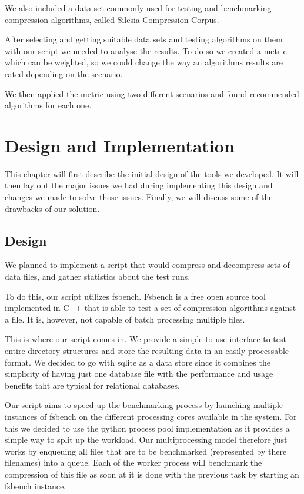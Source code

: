 \documentclass[
	12pt,
	a4paper,
	BCOR10mm,
	DIV14,
	listof=totoc,
	bibliography=totoc,
	headsepline
]{scrreprt}
\begin{document}
We also included a data set commonly used for testing and benchmarking compression algorithms, called Silesia Compression Corpus.

After selecting and getting suitable data sets and testing algorithms on them with our script we needed to analyse the results. To do so we created a metric which can be weighted, so we could change the way an algorithms results are rated depending on the scenario.

We then applied the metric using two different scenarios and found recommended algorithms for each one.

\chapter{Design and Implementation}
\label{Design}

This chapter will first describe the initial design of the tools we developed. It will then lay out the major issues we had during implementing this design and changes we made to solve those issues. Finally, we will discuss some of the drawbacks of our solution.

\section{Design}

We planned to implement a script that would compress and decompress sets of data files, and gather statistics about the test runs.

To do this, our script utilizes fsbench. Fsbench is a free open source tool implemented in C++ that is able to test a set of compression algorithms against a file. It is, however, not capable of batch processing multiple files.

This is where our script comes in. We provide a simple-to-use interface to test entire directory structures and store the resulting data in an easily processable format. We decided to go with sqlite as a data store since it combines the simplicity of having just one database file with the performance and usage benefits taht are typical for relational databases.

Our script aims to speed up the benchmarking process by launching multiple instances of fsbench on the different processing cores available in the system.
For this we decided to use the python process pool implementation as it provides a simple way to split up the workload.
Our multiprocessing model therefore just works by enqueuing all files that are to be benchmarked (represented by there filenames) into a queue.
Each of the worker process will benchmark the compression of this file as soon at it is done with the previous task by starting an fsbench instance.
\end{document}
